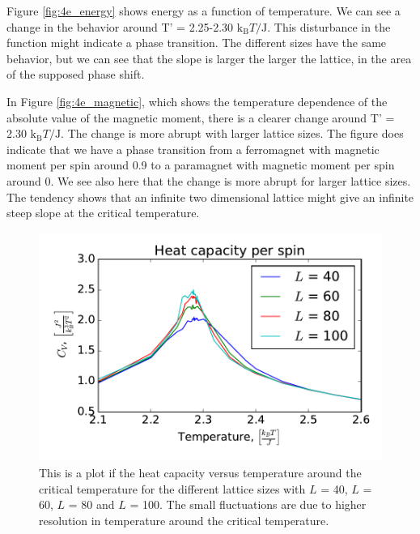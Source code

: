 Figure \ref{fig:4e_energy} shows energy as a function of temperature. We can see a change in the behavior around T' = 2.25-2.30 $\text{k}_\text{B}T/\text{J}$. This disturbance in the function might indicate a phase transition. The different sizes have the same behavior, but we can see that the slope is larger the larger the lattice, in the area of the supposed phase shift.

In Figure \ref{fig:4e_magnetic}, which shows the temperature dependence of the absolute value of the magnetic moment, there is a clearer change around T' = 2.30 $\text{k}_\text{B}T/\text{J}$. The change is more abrupt with larger lattice sizes. The figure does indicate that we have a phase transition from a ferromagnet with magnetic moment per spin around 0.9 to a paramagnet with magnetic moment per spin around 0. We see also here that the change is more abrupt for larger lattice sizes. The tendency shows that an infinite two dimensional lattice might give an infinite steep slope at the critical temperature. 

\begin{figure}[H]
\includegraphics[width=\linewidth]{../results/4e/4e_Cv}\caption{This is a plot if the heat capacity versus temperature around the critical temperature for the different lattice sizes with $L$ = 40, $L$ = 60, $L$ = 80 and $L$ = 100. The small fluctuations are due to higher resolution in temperature around the critical temperature.}\label{fig:4e_heat_capa}
\end{figure}

